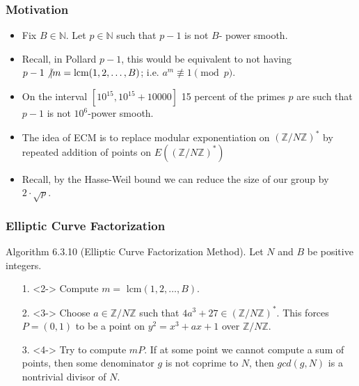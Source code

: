 \documentclass{beamer}
\begin{document}
\begin{frame}
\frametitle{Motivation}
\pause
\begin{itemize}
\item<2-> Fix $B \in \mathbb{N}$. Let $p \in \mathbb{N}$ such that $p-1$ is not $B$- power smooth.

\item<3-> Recall, in Pollard $p-1$, this would be equivalent to not having $p-1 \not \vert m = \text{lcm}(1,2, \ldots, B)$; i.e. $a^m \not \equiv 1 \pmod{p}$.

\item<4-> On the interval $[10^{15}, 10^{15} + 10000]$ 15 percent of the primes $p$ are such that $p-1$ is not $10^{6}$-power smooth.

\item<5-> The idea of ECM is to replace modular exponentiation on $\left(\mathbb{Z}/N\mathbb{Z}\right)^*$ by repeated addition of points on $E\left(\left(\mathbb{Z}/N\mathbb{Z}\right)^*\right)$

\item<6-> Recall, by the Hasse-Weil bound we can reduce the size of our group by $2\cdot \sqrt{p}$.
\end{itemize}
\end{frame}

\begin{frame}
\frametitle{Elliptic Curve Factorization}
\pause
Algorithm 6.3.10 (Elliptic Curve Factorization Method). Let $N$ and $B$ be positive integers.
\begin{itemize}
\item[1.]<2-> Compute $m =$ lcm$(1,2,\ldots, B)$.
\item[2.]<3-> Choose $a \in \mathbb{Z}/N\mathbb{Z}$ such that $4a^3 + 27 \in \left(\mathbb{Z}/N\mathbb{Z}\right)^*$. This forces $P = (0,1)$ to be a point on $y^2 = x^3 + ax +1$ over $\mathbb{Z}/N\mathbb{Z}$.
\item[3.]<4-> Try to compute $mP$. If at some point we cannot compute a sum of points, then some denominator $g$ is not coprime to $N$, then $gcd(g,N)$ is a nontrivial divisor of $N$.
\end{itemize}
\end{frame}
\end{document}
